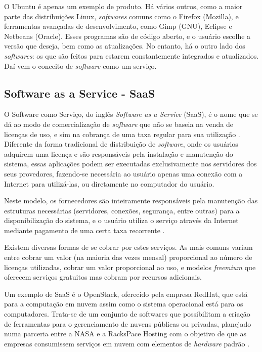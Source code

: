 \documentclass{classe_cn}                 %
\begin{document}
O Ubuntu é apenas um exemplo de produto. Há vários outros, como a maior parte das distribuições Linux, \textit{softwares} comuns como o Firefox (Mozilla), e ferramentas avançadas de desenvolvimento, como Gimp (GNU), Eclipse e Netbeans (Oracle). Esses programas são de código aberto, e o usuário escolhe a versão que deseja, bem como as atualizações. No entanto, há o outro lado dos \textit{softwares}: os que são feitos para estarem constantemente integrados e atualizados. Daí vem o conceito de \textit{software} como um serviço.

\subsection{Software as a Service - SaaS}

O Software como Serviço, do inglês \textit{Software as a Service} (SaaS), é o nome que se dá ao modo de comercialização de \textit{software} que não se baseia na venda de licenças de uso, e sim na cobrança de uma taxa regular para sua utilização \cite{Gorokhova}. Diferente da forma tradicional de distribuição de \textit{software}, onde os usuários adquirem uma licença e são responsáveis pela instalação e manutenção do sistema, essas aplicações podem ser executadas exclusivamente nos servidores dos seus provedores, fazendo-se necessária ao usuário apenas uma conexão com a Internet para utilizá-las, ou diretamente no computador do usuário.

Neste modelo, os fornecedores são inteiramente responsáveis pela manutenção das estruturas necessárias (servidores, conexões, segurança, entre outras) para a disponibilização do sistema, e o usuário utiliza o serviço através da Internet mediante pagamento de uma certa taxa recorrente \cite{Ricardo}. 

Existem diversas formas de se cobrar por estes serviços. As mais comuns variam entre cobrar um valor (na maioria das vezes mensal) proporcional ao número de licenças utilizadas, cobrar um valor proporcional ao uso, e modelos \textit{freemium} que oferecem serviços gratuitos mas cobram por recursos adicionais.

Um exemplo de SaaS é o OpenStack, oferecido pela empresa RedHat, que está para a computação em nuvem assim como o sistema operacional está para os computadores. Trata-se de um conjunto de softwares que possibilitam a criação de ferramentas para o gerenciamento de nuvens públicas ou privadas, planejado numa parceria entre a NASA e a RacksPace Hosting com o objetivo de que as empresas consumissem serviços em nuvem com elementos de \textit{hardware} padrão \cite{Open}.
\end{document}
